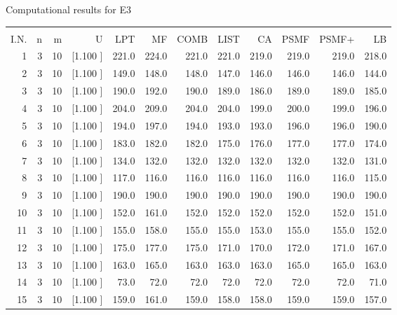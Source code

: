 \documentclass[12pt,a4paper]{article}
\begin{document}
\newpage
\begin{center}
 Computational results for E3 {\tiny
\begin{tabular}{r r r r r r r r r r r r}\hline
    &   &   &          &        &        &        &        &        &        &        &       \\[-0.1in]
  I.N.  &  n  &  m  &  U  &  LPT  &  MF  &  COMB  &  LIST  &  CA  & PSMF &PSMF+ & LB \\[0.03in]
\hline
   1&  3& 10&[1.100     ]&   221.0&   224.0&   221.0&   221.0&   219.0&   219.0&   219.0&   218.0\\[-0.02in]
   2&  3& 10&[1.100     ]&   149.0&   148.0&   148.0&   147.0&   146.0&   146.0&   146.0&   144.0\\[-0.02in]
   3&  3& 10&[1.100     ]&   190.0&   192.0&   190.0&   189.0&   186.0&   189.0&   189.0&   185.0\\[-0.02in]
   4&  3& 10&[1.100     ]&   204.0&   209.0&   204.0&   204.0&   199.0&   200.0&   199.0&   196.0\\[-0.02in]
   5&  3& 10&[1.100     ]&   194.0&   197.0&   194.0&   193.0&   193.0&   196.0&   196.0&   190.0\\[-0.02in]
   6&  3& 10&[1.100     ]&   183.0&   182.0&   182.0&   175.0&   176.0&   177.0&   177.0&   174.0\\[-0.02in]
   7&  3& 10&[1.100     ]&   134.0&   132.0&   132.0&   132.0&   132.0&   132.0&   132.0&   131.0\\[-0.02in]
   8&  3& 10&[1.100     ]&   117.0&   116.0&   116.0&   116.0&   116.0&   116.0&   116.0&   115.0\\[-0.02in]
   9&  3& 10&[1.100     ]&   190.0&   190.0&   190.0&   190.0&   190.0&   190.0&   190.0&   190.0\\[-0.02in]
  10&  3& 10&[1.100     ]&   152.0&   161.0&   152.0&   152.0&   152.0&   152.0&   152.0&   151.0\\[-0.02in]
  11&  3& 10&[1.100     ]&   155.0&   158.0&   155.0&   155.0&   153.0&   155.0&   155.0&   152.0\\[-0.02in]
  12&  3& 10&[1.100     ]&   175.0&   177.0&   175.0&   171.0&   170.0&   172.0&   171.0&   167.0\\[-0.02in]
  13&  3& 10&[1.100     ]&   163.0&   165.0&   163.0&   163.0&   163.0&   165.0&   165.0&   163.0\\[-0.02in]
  14&  3& 10&[1.100     ]&    73.0&    72.0&    72.0&    72.0&    72.0&    72.0&    72.0&    71.0\\[-0.02in]
  15&  3& 10&[1.100     ]&   159.0&   161.0&   159.0&   158.0&   158.0&   159.0&   159.0&   157.0\\[-0.02in]

\end{tabular}}
\end{center}
\end{document}

